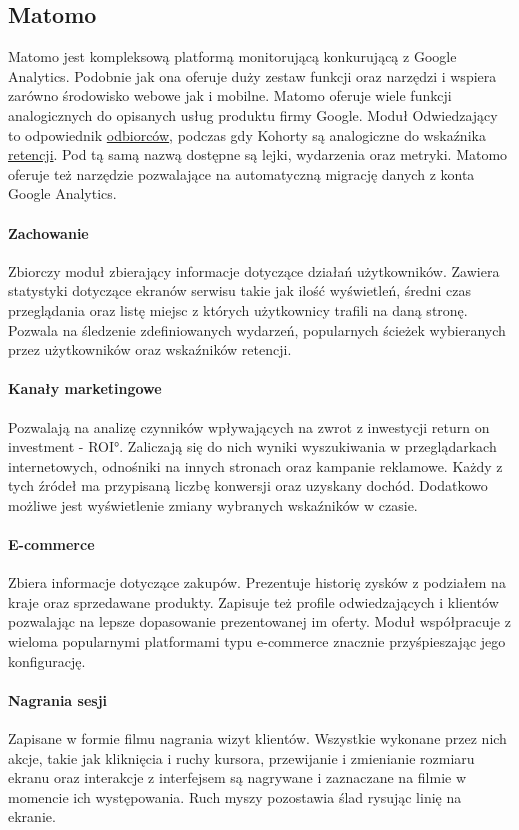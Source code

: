 \subsection{Matomo}
\label{sec:matomo}
Matomo jest kompleksową platformą monitorującą konkurującą z Google Analytics. Podobnie jak ona oferuje duży zestaw funkcji oraz narzędzi i wspiera zarówno środowisko webowe jak i mobilne. Matomo oferuje wiele funkcji analogicznych do opisanych usług produktu firmy Google. Moduł Odwiedzający to odpowiednik \hyperref[par:ga-audiences]{odbiorców}, podczas gdy Kohorty są analogiczne do wskaźnika \hyperref[par:ga-retention]{retencji}. Pod tą samą nazwą dostępne są lejki, wydarzenia oraz metryki. Matomo oferuje też narzędzie pozwalające na automatyczną migrację danych z konta Google Analytics.

\paragraph{Zachowanie}
Zbiorczy moduł zbierający informacje dotyczące działań użytkowników. Zawiera statystyki dotyczące ekranów serwisu takie jak ilość wyświetleń, średni czas przeglądania oraz listę miejsc z których użytkownicy trafili na daną stronę. Pozwala na śledzenie zdefiniowanych wydarzeń, popularnych ścieżek wybieranych przez użytkowników oraz wskaźników retencji.

\paragraph{Kanały marketingowe}
Pozwalają na analizę czynników wpływających na zwrot z inwestycji \ang{return on investment - ROI}. Zaliczają się do nich wyniki wyszukiwania w przeglądarkach internetowych, odnośniki na innych stronach oraz kampanie reklamowe. Każdy z tych źródeł ma przypisaną liczbę konwersji oraz uzyskany dochód. Dodatkowo możliwe jest wyświetlenie zmiany wybranych wskaźników w czasie.

\paragraph{E-commerce}
Zbiera informacje dotyczące zakupów. Prezentuje historię zysków z podziałem na kraje oraz sprzedawane produkty. Zapisuje też profile odwiedzających i klientów pozwalając na lepsze dopasowanie prezentowanej im oferty. Moduł współpracuje z wieloma popularnymi platformami typu e-commerce znacznie przyśpieszając jego konfigurację.

\paragraph{Nagrania sesji}
Zapisane w formie filmu nagrania wizyt klientów. Wszystkie wykonane przez nich akcje, takie jak kliknięcia i ruchy kursora, przewijanie i zmienianie rozmiaru ekranu oraz interakcje z interfejsem są nagrywane i zaznaczane na filmie w momencie ich występowania. Ruch myszy pozostawia ślad rysując linię na ekranie.


